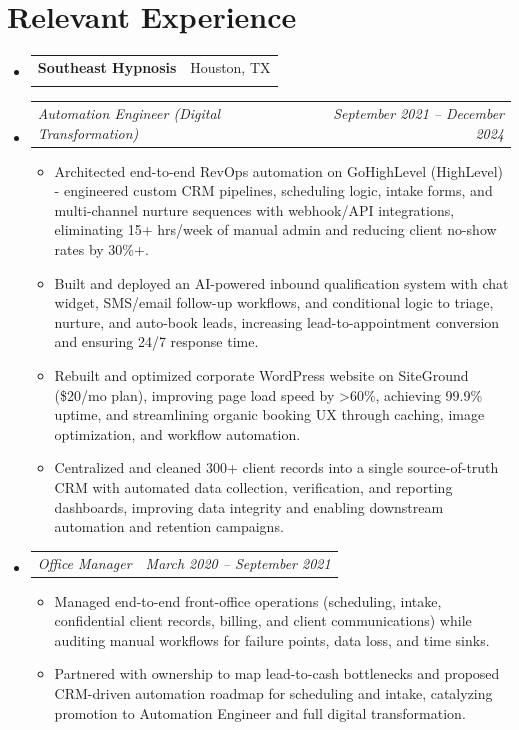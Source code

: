 \documentclass[letterpaper,11pt]{article}
\makeatletter
\newcommand{\resumeItem}[1]{
  \item\small{
    {#1 \vspace{-2pt}}
  }
}
\newcommand{\resumeSubheading}[4]{
  \vspace{-2pt}\item
    \begin{tabular*}{0.97\textwidth}[t]{l@{\extracolsep{\fill}}r}
      \textbf{#1} & #2 \\
      \textit{\small#3} & \textit{\small #4} \\
    \end{tabular*}\vspace{-7pt}
}
\newcommand{\resumeSubSubheading}[2]{
    \item
    \begin{tabular*}{0.97\textwidth}{l@{\extracolsep{\fill}}r}
      \textit{\small#1} & \textit{\small #2} \\
    \end{tabular*}\vspace{-7pt}
}
\newcommand{\resumeSubHeadingListStart}{\begin{itemize}[leftmargin=0.15in, label={}]}
\newcommand{\resumeSubHeadingListEnd}{\end{itemize}}
\newcommand{\resumeItemListStart}{\begin{itemize}}
\newcommand{\resumeItemListEnd}{\end{itemize}\vspace{-5pt}}
\makeatother
\begin{document}
\section{Relevant Experience}
\resumeSubHeadingListStart
  \resumeSubheading
    {Southeast Hypnosis}{Houston, TX}
    {}{}\vspace{-17pt}
    \resumeSubSubheading
      {Automation Engineer (Digital Transformation)}{September 2021 -- December 2024}
    \resumeItemListStart
        \resumeItem{Architected end-to-end RevOps automation on GoHighLevel (HighLevel) - engineered custom CRM pipelines, scheduling logic, intake forms, and multi-channel nurture sequences with webhook/API integrations, eliminating 15+ hrs/week of manual admin and reducing client no-show rates by 30\%+.}
        \resumeItem{Built and deployed an AI-powered inbound qualification system with chat widget, SMS/email follow-up workflows, and conditional logic to triage, nurture, and auto-book leads, increasing lead-to-appointment conversion and ensuring 24/7 response time.}
        \resumeItem{Rebuilt and optimized corporate WordPress website on SiteGround (\$20/mo plan), improving page load speed by >60\%, achieving 99.9\% uptime, and streamlining organic booking UX through caching, image optimization, and workflow automation.}
        \resumeItem{Centralized and cleaned 300+ client records into a single source-of-truth CRM with automated data collection, verification, and reporting dashboards, improving data integrity and enabling downstream automation and retention campaigns.}
    \resumeItemListEnd
    \resumeSubSubheading
      {Office Manager}{March 2020 -- September 2021}
    \resumeItemListStart
      \resumeItem{Managed end-to-end front-office operations (scheduling, intake, confidential client records, billing, and client communications) while auditing manual workflows for failure points, data loss, and time sinks.}
      \resumeItem{Partnered with ownership to map lead-to-cash bottlenecks and proposed CRM-driven automation roadmap for scheduling and intake, catalyzing promotion to Automation Engineer and full digital transformation.}
    \resumeItemListEnd
\resumeSubHeadingListEnd

\end{document}

